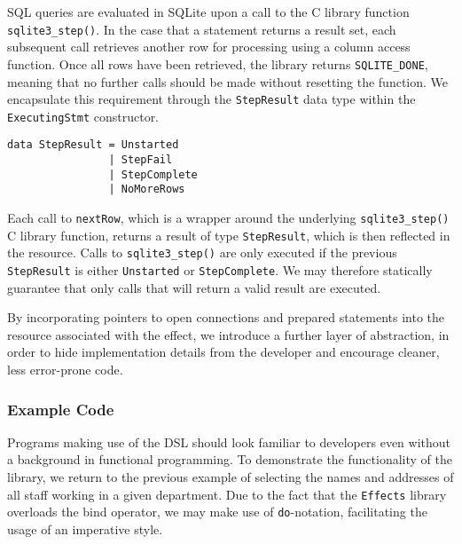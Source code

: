 \documentclass[preprint]{sigplanconf}
\begin{document}
SQL queries are evaluated in SQLite upon a call to the C library function \texttt{sqlite3\_step()}. In the case that a statement returns a result set, each subsequent call retrieves another row for processing using a column access function. Once all rows have been retrieved, the library returns \texttt{SQLITE\_DONE}, meaning that no further calls should be made without resetting the function. We encapsulate this requirement through the \texttt{StepResult} data type within the \texttt{ExecutingStmt} constructor. 
\begin{Verbatim}
data StepResult = Unstarted
                | StepFail
                | StepComplete
                | NoMoreRows
\end{Verbatim}
Each call to \texttt{nextRow}, which is a wrapper around the underlying \texttt{sqlite3\_step()} C library function, returns a result of type \texttt{StepResult}, which is then reflected in the resource. Calls to \texttt{sqlite3\_step()} are only executed if the previous \texttt{StepResult} is either \texttt{Unstarted} or \texttt{StepComplete}. We may therefore statically guarantee that only calls that will return a valid result are executed. 

By incorporating pointers to open connections and prepared statements into the resource associated with the effect, we introduce a further layer of abstraction, in order to hide implementation details from the developer and encourage cleaner, less error-prone code. 

\subsubsection{Example Code}
Programs making use of the DSL should look familiar to developers even without a background in functional programming. To demonstrate the functionality of the library, we return to the previous example of selecting the names and addresses of all staff working in a given department. Due to the fact that the \texttt{Effects} library overloads the bind operator, we may make use of \texttt{do}-notation, facilitating the usage of an imperative style.
\end{document}
